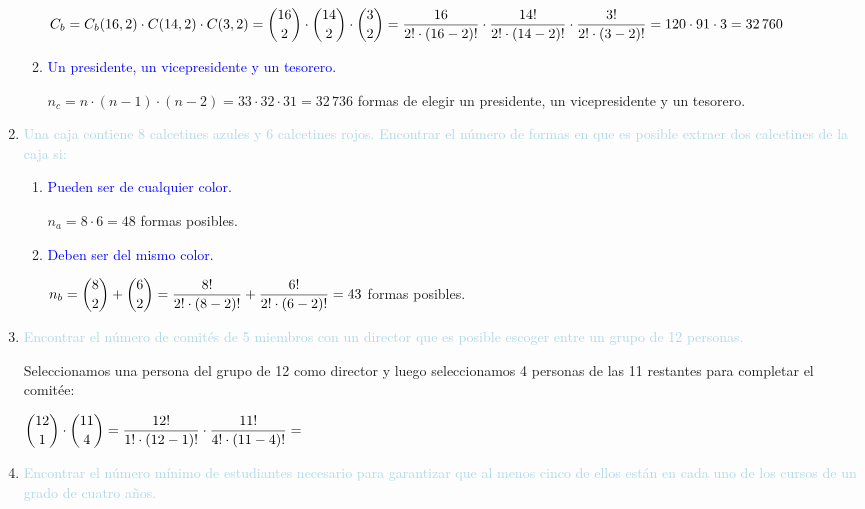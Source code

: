 \documentclass{article}
\newcommand{\lb}[1]{\textcolor{lightblue}{#1}}
\newcommand{\db}[1]{\textcolor{blue}{#1}}
\newcommand{\rbinom}[2]{\dfrac{#1!}{#2!\cdot(#1-#2)!}}
\begin{document}
\begin{enumerate}[label=\color{red}\textbf{\arabic*)}, leftmargin=*]
\begin{enumerate}[label=\color{red}\alph*)]
        $C_b=C_b(16,2) \cdot C(14,2)\cdot C(3,2)=\dbinom{16}{2}\cdot\dbinom{14}{2}\cdot\dbinom{3}{2}=\dfrac{16}{2!\cdot(16-2)!}\cdot\dfrac{14!}{2!\cdot(14-2)!}\cdot\dfrac{3!}{2!\cdot(3-2)!}=120\cdot91\cdot3=32\,760$
        \item \db{Un presidente, un vicepresidente y un tesorero.}
        
        $n_c=n\cdot(n-1)\cdot(n-2)=33\cdot32\cdot31=32\,736$ formas de elegir un presidente, un vicepresidente y un tesorero.
    \end{enumerate}
    \item \lb{Una caja contiene 8 calcetines azules y 6 calcetines rojos. Encontrar el número de formas en que es posible extraer dos calcetines de la caja si:}
    \begin{enumerate}[label=\color{red}\alph*)]
    	\item \db{Pueden ser de cualquier color.}
        
        $n_a=8\cdot6=48$ formas posibles.
        \item \db{Deben ser  del mismo color.}
        
        $n_b=\dbinom{8}{2}+\dbinom{6}{2}=\dfrac{8!}{2!\cdot(8-2)!}+\dfrac{6!}{2!\cdot(6-2)!}=43$ formas posibles.
    \end{enumerate}
    \item \lb{Encontrar el número de comités de 5 miembros con un director que es posible escoger entre un grupo de 12 personas.}
    
    Seleccionamos una persona del grupo de 12 como director y luego seleccionamos 4 personas de las 11 restantes para completar el comitée:
    
    $\dbinom{12}{1}\cdot\dbinom{11}{4}=\dfrac{12!}{1!\cdot(12-1)!}\cdot\rbinom{11}{4}=$
    \item \lb{Encontrar el número mínimo de estudiantes necesario para garantizar que al menos cinco de ellos están en cada uno de los cursos de un grado de cuatro años.}
\end{enumerate}
\end{document}
